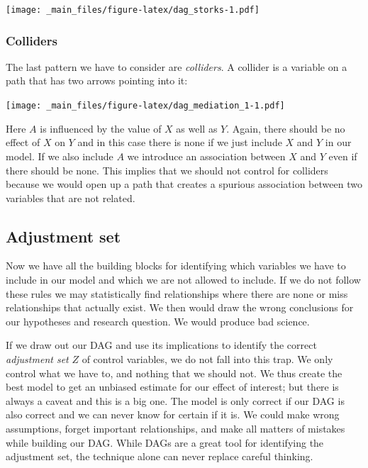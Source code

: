 \documentclass[
]{book}
\begin{document}
\texttt{[image: \_main\_files/figure-latex/dag\_storks-1.pdf]}

\hypertarget{colliders}{%
\subsubsection{Colliders}\label{colliders}}

The last pattern we have to consider are \emph{colliders}. A collider is a variable
on a path that has two arrows pointing into it:

\texttt{[image: \_main\_files/figure-latex/dag\_mediation\_1-1.pdf]}

Here \(A\) is influenced by the value of \(X\) as well as \(Y\). Again, there should
be no effect of \(X\) on \(Y\) and in this case there is none if we just include \(X\)
and \(Y\) in our model. If we also include \(A\) we introduce an association
between \(X\) and \(Y\) even if there should be none. This implies that we should
not control for colliders because we would open up a path that creates a spurious
association between two variables that are not related.

\hypertarget{adjustment-set}{%
\subsection{Adjustment set}\label{adjustment-set}}

Now we have all the building blocks for identifying which variables we have to
include in our model and which we are not allowed to include. If we do not follow
these rules we may statistically find relationships where there are none or miss
relationships that actually exist. We then would draw the wrong conclusions for
our hypotheses and research question. We would produce bad science.

If we draw out our DAG and use its implications to identify the correct
\emph{adjustment set} \(Z\) of control variables, we do not fall into this trap.
We only control what we have to, and nothing that we should not. We thus create
the best model to get an unbiased estimate for our effect of interest;
but there is always a caveat and this is a big one. The model is only correct if
our DAG is also correct and we can never know for certain if it is. We could
make wrong assumptions, forget important relationships, and make all matters of
mistakes while building our DAG. While DAGs are a great tool for identifying the
adjustment set, the technique alone can never replace careful thinking.
\end{document}

